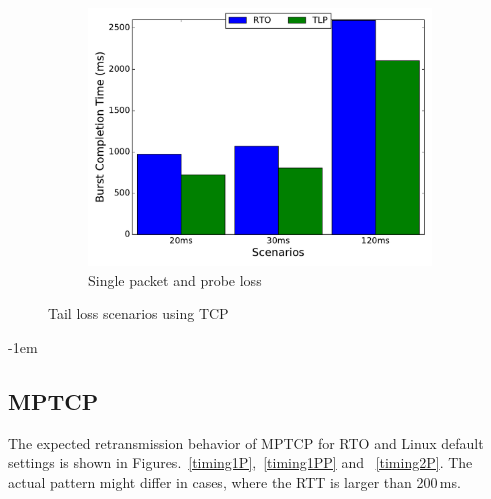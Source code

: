 \documentclass[10pt,conference,compsoc]{IEEEtran}
\begin{document}
\begin{figure}[!tbp]
\begin{subfigure}[b]{0.32\textwidth}
	\includegraphics[angle=0, width=\textwidth, natwidth=578.16,natheight=433.62]{plots/T1PP.pdf}
	\caption{Single packet and probe loss }\label{t1pp}
 \end{subfigure}
 \caption{Tail loss scenarios using TCP}
\end{figure}
\kern-1em
\subsection{MPTCP}


The expected retransmission behavior of MPTCP for RTO and Linux default settings is shown 
in Figures.~\ref{timing1P},~\ref{timing1PP} and ~\ref{timing2P}. The actual pattern might differ in cases,
where the RTT is larger than 200\,ms. 
\end{document}
